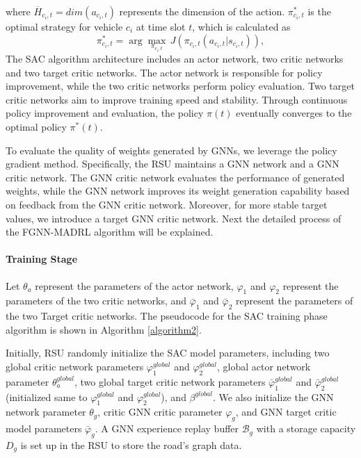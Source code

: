 \documentclass[lettersize,journal,onecolumn]{IEEEtran}
\begin{document}
where ${{\overline{H}}_{{{c}_{i}},t}}=dim({{a}_{{{c}_{i}},t}})$ represents the dimension of the action. $\pi _{{{c}_{i}},t}^{*}$ is the optimal strategy for vehicle ${{c}_{i}}$ at time slot $t$, which is calculated as
\begin{equation}
\pi _{{{c}_{i}},t}^{*}=\arg \underset{{{\pi }_{{{c}_{i}},t}}}{\mathop{\max }}\,J\left( {{\pi }_{{{c}_{i}},t}}\left( {{a}_{{{c}_{i}},t}}|{{s}_{{{c}_{i}},t}} \right) \right)
\label{eq28},
\end{equation}
The SAC algorithm architecture includes an actor network, two critic networks and two target critic networks. The actor network is responsible for policy improvement, while the two critic networks perform policy evaluation. Two target critic networks aim to improve training speed and stability. Through continuous policy improvement and evaluation, the policy $\pi (t)$ eventually converges to the optimal policy ${{\pi }^{*}}(t)$.

To evaluate the quality of weights generated by GNNs, we leverage the policy gradient method. Specifically, the RSU maintains a GNN network and a GNN critic network. The GNN critic network evaluates the performance of generated weights, while the GNN network improves its weight generation capability based on feedback from the GNN critic network. Moreover, for more stable target values, we introduce a target GNN critic network. Next the detailed process of the FGNN-MADRL algorithm will be  explained.


\paragraph{Training Stage}
Let ${{\theta }_{a}}$ represent the parameters of the actor network, ${{\varphi }_{1}}$ and ${{\varphi }_{2}}$ represent the parameters of the two critic networks, and ${{\bar{\varphi }}_{1}}$ and ${{\bar{\varphi }}_{2}}$ represent the parameters of the two Target critic networks. The pseudocode for the SAC training phase algorithm is shown in Algorithm \ref{algorithm2}.

Initially, RSU randomly initialize the SAC model parameters, including two global critic network parameters $\varphi _{1}^{global}$ and $\varphi _{2}^{global}$, global actor network parameter $\theta _{a}^{global}$, two global target critic network parameters $\bar{\varphi }_{1}^{global}$ and $\bar{\varphi }_{2}^{global}$ (initialized same to $\varphi _{1}^{global}$ and $\varphi _{2}^{global}$), and ${{\beta }^{{g}lobal}}$. We also initialize the GNN network parameter ${{\theta }_{g}}$, critic GNN critic parameter ${{\varphi }_{g}}$, and GNN target critic model parameters ${{\bar{\varphi }}_{g}}$. A GNN experience replay buffer ${{\mathcal{B}}_{g}}$ with a storage capacity ${{D}_{g}}$ is set up in the RSU to store the road's graph data.
\end{document}
